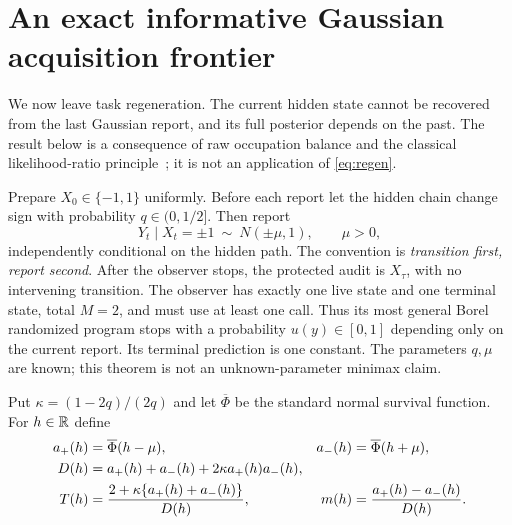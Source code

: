 \section{An exact informative Gaussian acquisition frontier}\label{sec:gaussian}
We now leave task regeneration. The current hidden state cannot be recovered from the last Gaussian report, and its full posterior depends on the past. The result below is a consequence of raw occupation balance and the classical likelihood-ratio principle~\cite{NP}; it is not an application of \eqref{eq:regen}.

Prepare $X_0\in\{-1,1\}$ uniformly. Before each report let the hidden chain change sign with probability $q\in(0,1/2]$. Then report
\[
 Y_t\mid X_t=\pm1\ \sim\ N(\pm\mu,1),\qquad \mu>0,
\]
independently conditional on the hidden path. The convention is \emph{transition first, report second}. After the observer stops, the protected audit is $X_\tau$, with no intervening transition. The observer has exactly one live state and one terminal state, total $M=2$, and must use at least one call. Thus its most general Borel randomized program stops with a probability $u(y)\in[0,1]$ depending only on the current report. Its terminal prediction is one constant. The parameters $q,\mu$ are known; this theorem is not an unknown-parameter minimax claim.

Put $\kappa=(1-2q)/(2q)$ and let $\overline\Phi$ be the standard normal survival function. For $h\in\mathbb R$ define
\begin{align}
 a_+(h)&=\overline\Phi(h-\mu),&
 a_-(h)&=\overline\Phi(h+\mu),\notag\\
 D(h)&=a_+(h)+a_-(h)+2\kappa a_+(h)a_-(h),\notag\\
 T(h)&=\frac{2+\kappa\{a_+(h)+a_-(h)\}}{D(h)},&
 m(h)&=\frac{a_+(h)-a_-(h)}{D(h)}.\label{eq:gaussian-curve}
\end{align}

